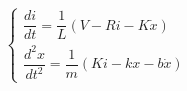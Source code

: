 \documentclass[preview]{standalone}
\begin{document}
\begin{align*}
\begin{cases} \dfrac{di}{dt} = \dfrac{1}{L}(V - R i - K \dot{x}) \\ \dfrac{d^2x}{dt^2} = \dfrac{1}{m}(K i - kx - b \dot{x}) \end{cases}
\end{align*}
\end{document}
